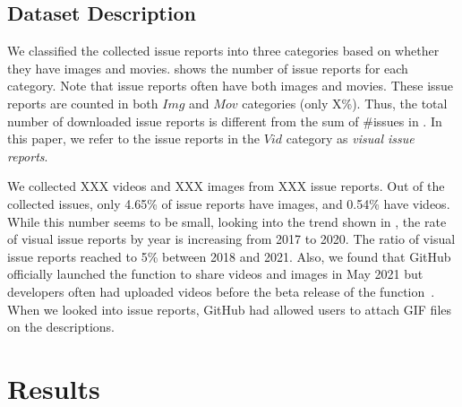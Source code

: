 \subsection{Dataset Description}

We classified the collected issue reports into three categories based on whether they have images and movies.  shows the number of issue reports for each category. 
Note that issue reports often have both images and movies. 
These issue reports are counted in both $Img$ and $Mov$ categories (only X\%). 
Thus, the total number of downloaded issue reports is different from the sum of \#issues in . 
In this paper, we refer to the issue reports in the $Vid$ category 
as \textit{visual issue reports}. 

We collected XXX videos and XXX images from XXX issue reports. 
Out of the collected issues, only 4.65\% of issue reports have images, and 0.54\% have videos. 
While this number seems to be small, looking into the trend shown in , the rate of visual issue reports by year is increasing from 2017 to 2020. 
The ratio of visual issue reports reached to 5\% between 2018 and 2021. 
Also, we found that GitHub officially launched the function to share videos and images in May 2021 but developers often had uploaded videos before the beta release of the function~\citep{github-video-blog}. 
When we looked into issue reports, GitHub had allowed users to attach GIF files on the descriptions. 


\section{Results}
\label{sec:results}

% 


